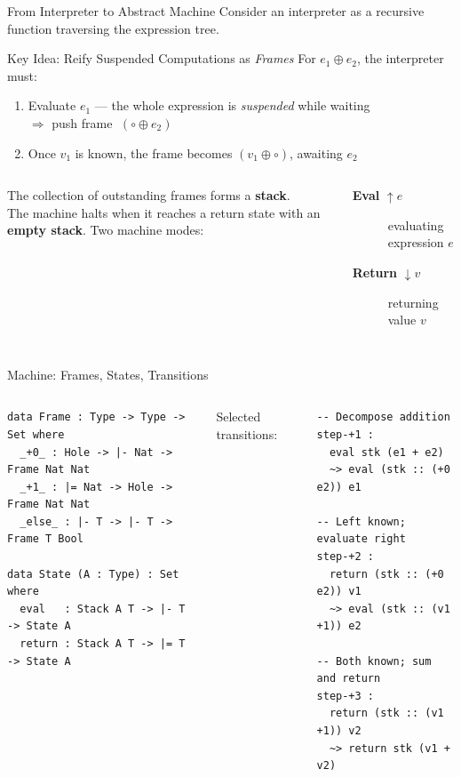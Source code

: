 \documentclass[10pt,compress,aspectratio=169]{beamer}
\begin{document}
\begin{frame}{From Interpreter to Abstract Machine}
  Consider an interpreter as a recursive function traversing the expression tree.
  \begin{block}{Key Idea: Reify Suspended Computations as \emph{Frames}}
    For $e_1 \oplus e_2$, the interpreter must:
    \begin{enumerate}
      \item Evaluate $e_1$ --- the whole expression is \emph{suspended} while waiting\\[2pt]
            $\Rightarrow$ push frame $\;(\circ \oplus e_2)$
      \item Once $v_1$ is known, the frame becomes $(v_1 \oplus \circ)$, awaiting $e_2$
    \end{enumerate}
  \end{block}
  \bigskip
  \begin{columns}[T]
      The collection of outstanding frames forms a \textbf{stack}.\\[4pt]
      The machine halts when it reaches a return state with an \textbf{empty stack}.
      Two machine modes:
      \begin{description}
        \item[\textbf{Eval} $\uparrow e$] evaluating expression $e$
        \item[\textbf{Return} $\downarrow v$] returning value $v$
      \end{description}
  \end{columns}
\end{frame}

\begin{frame}[fragile]{Machine: Frames, States, Transitions}
  \begin{columns}[T]
      \begin{verbatim}
data Frame : Type -> Type -> Set where
  _+0_ : Hole -> |- Nat -> Frame Nat Nat
  _+1_ : |= Nat -> Hole -> Frame Nat Nat
  _else_ : |- T -> |- T -> Frame T Bool

data State (A : Type) : Set where
  eval   : Stack A T -> |- T -> State A
  return : Stack A T -> |= T -> State A
      \end{verbatim}
      Selected transitions:
      \begin{verbatim}
-- Decompose addition
step-+1 :
  eval stk (e1 + e2)
  ~> eval (stk :: (+0 e2)) e1

-- Left known; evaluate right
step-+2 :
  return (stk :: (+0 e2)) v1
  ~> eval (stk :: (v1 +1)) e2

-- Both known; sum and return
step-+3 :
  return (stk :: (v1 +1)) v2
  ~> return stk (v1 + v2)
      \end{verbatim}
  \end{columns}
\end{frame}
\end{document}
